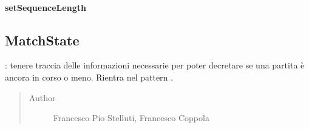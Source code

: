 \documentclass[letterpaper,10pt,italian,openany,oneside]{sphinxmanual}
\begin{document}
\begin{fulllineitems}
\label{\detokenize{source/it/unicam/cs/pa/mastermind/gamecore/MatchStartSettings:it.unicam.cs.pa.mastermind.gamecore.MatchStartSettings.setMakerFactory(MakerFactory)}}
\end{fulllineitems}



\paragraph{setSequenceLength}
\label{\detokenize{source/it/unicam/cs/pa/mastermind/gamecore/MatchStartSettings:setsequencelength}}

\begin{fulllineitems}
\label{\detokenize{source/it/unicam/cs/pa/mastermind/gamecore/MatchStartSettings:it.unicam.cs.pa.mastermind.gamecore.MatchStartSettings.setSequenceLength(int)}}
\end{fulllineitems}



\subsection{MatchState}
\label{\detokenize{source/it/unicam/cs/pa/mastermind/gamecore/MatchState:matchstate}}\label{\detokenize{source/it/unicam/cs/pa/mastermind/gamecore/MatchState::doc}}

\begin{fulllineitems}
\label{\detokenize{source/it/unicam/cs/pa/mastermind/gamecore/MatchState:it.unicam.cs.pa.mastermind.gamecore.MatchState}}
: tenere traccia delle informazioni necessarie per poter decretare se una partita è ancora in corso o meno. Rientra nel pattern .
\begin{quote}\begin{description}
\item[{Author}] \leavevmode
Francesco Pio Stelluti, Francesco Coppola

\end{description}\end{quote}

\end{fulllineitems}
\end{document}
